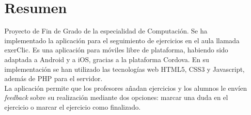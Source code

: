 \section*{Resumen}

Proyecto de Fin de Grado de la especialidad de Computación. Se ha implementado la aplicación para el seguimiento de ejercicios en el aula llamada exerClic. Es una aplicación para móviles libre de plataforma, habiendo sido adaptada a Android y a iOS, gracias a la plataforma Cordova. En su implementación se han utilizado las tecnologías web HTML5, CSS3 y Javascript, además de PHP para el servidor.\\

La aplicación permite que los profesores añadan ejercicios y los alumnos le envíen \textit{feedback} sobre su realización mediante dos opciones: marcar una duda en el ejercicio o marcar el ejercicio como finalizado.\\
